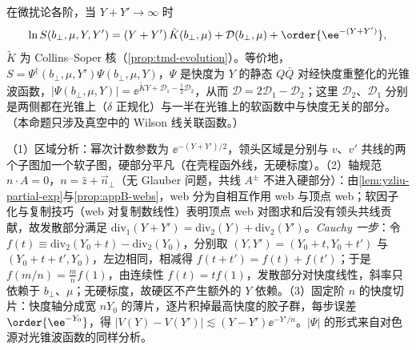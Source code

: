 \begin{proposition}\label{prop:yzliu-rapidity-linear}
在微扰论各阶，当 $Y+Y'\to\infty$ 时
\begin{equation}\label{eq:yzliu-rapidity-linear}
\ln S(b_\perp,\mu,Y,Y')=(Y+Y')\,\tilde K(b_\perp,\mu)+\mathcal D(b_\perp,\mu)+\order{\ee^{-(Y+Y')}} ,
\end{equation}
$\tilde K$ 为 Collins--Soper 核（\cref{prop:tmd-evolution}）。等价地，$S=\Psi^\dagger(b_\perp,\mu,Y')\Psi(b_\perp,\mu,Y)$，$\Psi$ 是快度为 $Y$ 的静态 $Q\bar Q$ 对经快度重整化的光锥波函数\cite[式~(116)]{Liu:2022nnk}，$|\Psi(b_\perp,\mu,Y)|=\ee^{\tilde KY+\mathcal D_1-\frac12\mathcal D_2}$，从而 $\mathcal D=2\mathcal D_1-\mathcal D_2$；这里 $\mathcal D_2$、$\mathcal D_1$ 分别是两侧都在光锥上（$\delta$ 正规化）与一半在光锥上的软函数中与快度无关的部分。（本命题只涉及真空中的 Wilson 线关联函数。）
\end{proposition}

\begin{proofsketch}
（1）区域分析\cite[第~4.4~节]{Liu:2022nnk}：幂次计数参数为 $\ee^{-(Y+Y')/2}$，领头区域是分别与 $v$、$v'$ 共线的两个子图加一个软子图，硬部分平凡（在壳程函外线，无硬标度）。（2）轴规范 $n\cdot A=0$，$n=\hat z+\vec n_\perp$（无 Glauber 问题，共线 $A^\pm$ 不进入硬部分）\cite[附录~E]{Liu:2022nnk}：由\cref{lem:yzliu-partial-exp}与\cref{prop:appB-webs}，web 分为自相互作用 web 与顶点 web；软因子化与复制技巧（web 对复制数线性）表明顶点 web 对图求和后没有领头共线贡献，故发散部分满足 $\mathrm{div}_1(Y+Y')=\mathrm{div}_2(Y)+\mathrm{div}_2(Y')$。\emph{Cauchy 一步}：令 $f(t)\equiv\mathrm{div}_2(Y_0+t)-\mathrm{div}_2(Y_0)$，分别取 $(Y,Y')=(Y_0+t,Y_0+t')$ 与 $(Y_0+t+t',Y_0)$，左边相同，相减得 $f(t+t')=f(t)+f(t')$；于是 $f(m/n)=\frac mnf(1)$，由连续性 $f(t)=tf(1)$，发散部分对快度线性，斜率只依赖于 $b_\perp$、$\mu$；无硬标度，故硬区不产生额外的 $Y$ 依赖。（3）固定阶 $n$ 的快度切片：快度轴分成宽 $nY_0$ 的薄片，逐片积掉最高快度的胶子群，每步误差 $\order{\ee^{-Y_0}}$，得 $|V(Y)-V(Y')|\lesssim(Y-Y')\ee^{-Y'/n}$\cite[式~(E.1)--(E.13)]{Liu:2022nnk}。$|\Psi|$ 的形式来自对色源对光锥波函数的同样分析\cite[式~(116)--(122)]{Liu:2022nnk}。
\end{proofsketch}

